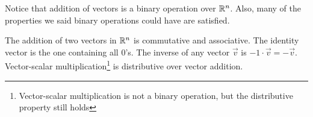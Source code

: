 Notice that addition of vectors is a binary operation over $\mathbb{R}^n$.
Also, many of the properties we said binary operations could have are satisfied.
\begin{theorem}
	The addition of two vectors in $\mathbb{R}^n$ is commutative and associative.
	The identity vector is the one containing all 0's.
	The inverse of any vector $\vec{v}$ is $-1 \cdot \vec{v} = -\vec{v}$.
	Vector-scalar multiplication\footnote{Vector-scalar multiplication is not a binary operation, but the distributive property still holds} is distributive over vector addition.
\end{theorem}

